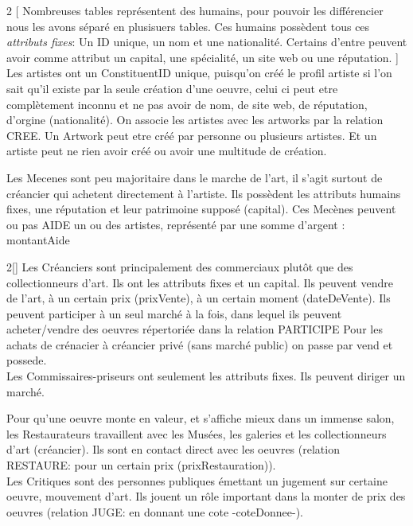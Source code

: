 \documentclass{article}
\begin{document}
\begin{multicols}{2}
[
Nombreuses tables représentent des humains, pour pouvoir les différencier nous les avons séparé en plusisuers tables.
Ces humains possèdent tous ces \emph{attributs fixes}: \newline
    Un ID unique, un nom et une nationalité.
Certains d'entre peuvent avoir comme attribut un capital, une spécialité, un site web ou une réputation.
]
Les artistes ont un ConstituentID unique,
puisqu'on créé le profil artiste si l'on sait qu'il existe par la seule création d'une oeuvre, celui ci peut etre complètement inconnu et ne pas avoir de nom, de site web, de réputation, d'orgine (nationalité). \newline
    On associe les artistes avec les artworks par la relation CREE.
Un Artwork peut etre créé par personne ou plusieurs artistes. Et un artiste peut ne rien avoir créé ou avoir une multitude de création.

    Les Mecenes sont peu majoritaire dans le marche de l'art,
il s'agit surtout de créancier qui achetent directement à l'artiste. Ils possèdent les attributs humains fixes, une réputation et leur patrimoine supposé (capital). \newline
Ces Mecènes peuvent ou pas AIDE un ou des artistes, représenté par une somme d'argent : montantAide \newline
 \newline
\end{multicols}
    
\begin{multicols}{2}[]
Les Créanciers sont principalement des commerciaux plutôt que des collectionneurs d'art. 
Ils ont les attributs fixes et un capital.
Ils peuvent vendre de l'art, à un certain prix (prixVente), à un certain moment (dateDeVente).
Ils peuvent participer à un seul marché à la fois, dans lequel ils peuvent acheter/vendre des oeuvres répertoriée dans la relation PARTICIPE
Pour les achats de crénacier à créancier privé (sans marché public) on passe par vend et possede.
\\

    Les Commissaires-priseurs ont seulement les attributs fixes.
Ils peuvent diriger un marché. 

    Pour qu'une oeuvre monte en valeur, et s'affiche mieux dans un immense salon, les Restaurateurs travaillent avec les Musées, les galeries et les collectionneurs d'art (créancier).
Ils sont en contact direct avec les oeuvres (relation RESTAURE: pour un certain prix (prixRestauration)).
\\

    Les Critiques sont des personnes publiques émettant un jugement sur certaine oeuvre, mouvement d'art.
Ils jouent un rôle important dans la monter de prix des oeuvres (relation JUGE: en donnant une cote -coteDonnee-).
\end{multicols}
\end{document}
